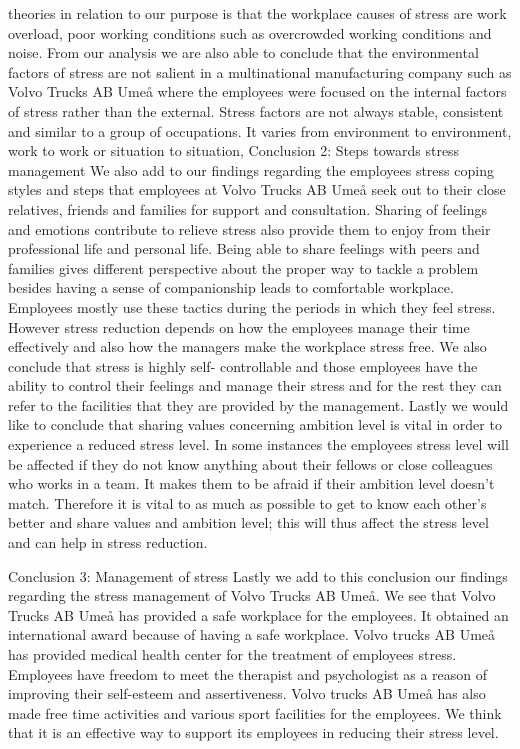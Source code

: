 theories in relation to our purpose is that the workplace causes of stress are work overload, 
poor  working  conditions  such  as  overcrowded  working  conditions  and  noise.  From  our 
analysis we are also able to conclude that the environmental factors of stress are not salient in 
a  multinational  manufacturing  company  such  as  Volvo  Trucks  AB  Umeå  where  the 
employees  were  focused  on  the  internal  factors  of  stress  rather  than  the  external.    Stress 
factors are not always stable, consistent and similar to a group of occupations. It varies from 
environment to environment, work to work or situation to situation, 
Conclusion 2: Steps towards stress management 
We  also  add  to  our  findings  regarding  the  employees  stress  coping  styles  and  steps  that 
employees at Volvo Trucks AB Umeå seek out to their close relatives, friends and families for 
support and consultation. Sharing of feelings and emotions contribute to relieve stress  also 
provide  them  to  enjoy  from  their  professional  life  and  personal  life.  Being  able  to  share 
feelings with peers and families gives different perspective about the proper way to tackle a 
problem  besides  having  a  sense  of  companionship  leads  to  comfortable  workplace. 
Employees  mostly  use  these  tactics  during  the  periods  in  which  they  feel  stress.  However 
stress reduction depends on how the employees manage their time effectively and also how 
the  managers  make  the  workplace  stress  free.  We  also  conclude  that  stress  is  highly  self-
controllable and those employees have the ability to control their feelings and manage their 
stress and for the rest they can refer to the facilities that they are provided by the management. 
Lastly  we  would  like  to  conclude  that  sharing  values  concerning  ambition  level  is  vital  in 
order to experience a reduced stress level. In some instances the employees stress level will be 
affected if they do not know anything about their fellows or close colleagues who works in a 
team. It makes them to be afraid if their ambition level doesn’t match. Therefore it is vital to 
as much as possible to get to know each other’s better and share values and ambition level; 
this will thus affect the stress level and can help in stress reduction.  
 
Conclusion 3: Management of stress  
Lastly  we  add  to  this  conclusion  our  findings  regarding  the  stress  management  of  Volvo 
Trucks AB Umeå. We see that Volvo Trucks AB Umeå has provided a safe workplace for the 
employees.  It  obtained  an  international  award  because  of  having  a  safe  workplace.  Volvo 
trucks AB Umeå has provided medical health center for the treatment of employees stress. 
Employees have freedom to meet the therapist and psychologist as a reason of improving their 
self-esteem and assertiveness. Volvo trucks AB Umeå has also made free time activities and 
various sport facilities for the employees. We think that it is an effective way to support its 
employees in reducing their stress level.  
 
